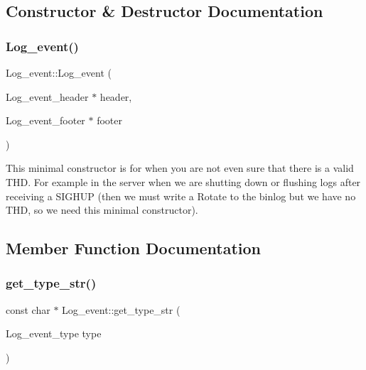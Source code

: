 \subsection{Constructor \& Destructor Documentation}
\mbox{\label{classLog__event_a0cd9aa0060929d5f09af84f0e8ee6136}} 
\subsubsection{\texorpdfstring{Log\+\_\+event()}{Log\_event()}}
{\footnotesize\ttfamily Log\+\_\+event\+::\+Log\+\_\+event (\begin{DoxyParamCaption}\item[{Log\+\_\+event\+\_\+header $\ast$}]{header,  }\item[{Log\+\_\+event\+\_\+footer $\ast$}]{footer }\end{DoxyParamCaption})}

This minimal constructor is for when you are not even sure that there is a valid T\+HD. For example in the server when we are shutting down or flushing logs after receiving a S\+I\+G\+H\+UP (then we must write a Rotate to the binlog but we have no T\+HD, so we need this minimal constructor). 

\subsection{Member Function Documentation}
\mbox{\label{classLog__event_a7fcd48f109191f0aab883877e2d0bc6d}} 
\subsubsection{\texorpdfstring{get\+\_\+type\+\_\+str()}{get\_type\_str()}\hspace{0.1cm}{\footnotesize\ttfamily [1/2]}}
{\footnotesize\ttfamily const char $\ast$ Log\+\_\+event\+::get\+\_\+type\+\_\+str (\begin{DoxyParamCaption}\item[{Log\+\_\+event\+\_\+type}]{type }\end{DoxyParamCaption})\hspace{0.3cm}{\ttfamily [static]}}

